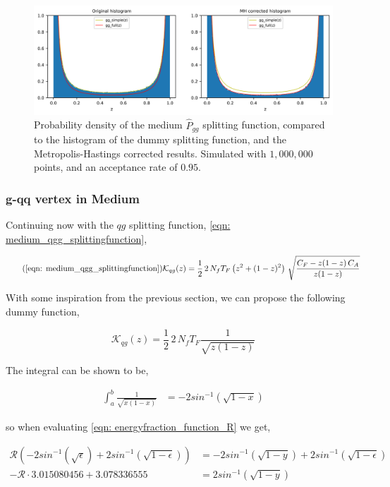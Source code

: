 \documentclass[main.tex]{subfiles}
\begin{document}
\begin{figure}[ht]
    \centering
    \includegraphics[width=14cm]{pictures/MH_plots/MH_medium_gg.png}
    \caption{Probability density of the medium \(\hat{P}_{gg}\) splitting function, compared to the histogram of the dummy splitting function, and the Metropolis-Hastings corrected results. Simulated with \(1,000,000\) points, and an acceptance rate of \(0.95\).}
    \label{fig: MH_corrected_p_gg_medium_splitting}
\end{figure}

\subsubsection{g-qq vertex in Medium}
Continuing now with the \(qg\) splitting function, \autoref{eqn: medium_qgg_splittingfunction}, 

\begin{equation}\tag{\ref{eqn: medium_qgg_splittingfunction}}
    \mathcal{K}_{qg}(z) = \frac{1}{2} \, 2\, N_f T_F \left(z^2 + (1-z)^2 \right) \, \sqrt{\frac{C_F - z(1-z) \, C_A}{z(1-z)}}
\end{equation}

With some inspiration from the previous section, we can propose the following dummy function,

\begin{equation}
    \mathcal{K}_{qg}(z) = \frac{1}{2} \, 2\, N_f T_F \frac{1}{\sqrt{z (1-z)}}
\end{equation}

The integral can be shown to be, 

\begin{align}
    \int_a^b \frac{1}{\sqrt{x(1-x)} } &= -2 sin^{-1}(\sqrt{1-x})
\end{align}

so when evaluating \autoref{eqn: energyfraction_function_R} we get,

\begin{align}
    \mathcal{R}\left( -2 sin^{-1}(\sqrt{\epsilon}) + 2 sin^{-1}(\sqrt{1-\epsilon})  \right) &= -2 sin^{-1}(\sqrt{1-y}) + 2 sin^{-1}(\sqrt{1-\epsilon}) \nonumber\\
    -\mathcal{R} \cdot 3.015080456 + 3.078336555 &= 2 sin^{-1}(\sqrt{1-y}) 
\end{align}
\end{document}
